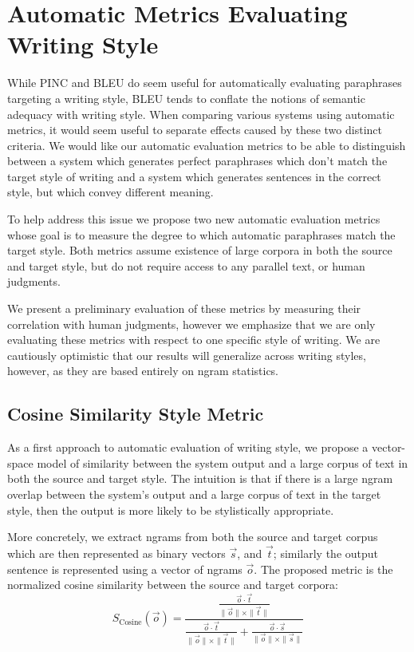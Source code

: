 \documentclass[10pt,a5paper,twoside]{article}
\begin{document}
\section{Automatic Metrics Evaluating Writing Style}
While PINC and BLEU do seem useful for automatically evaluating paraphrases targeting a  writing style, BLEU tends to conflate the notions of
semantic adequacy with writing style.  When comparing various systems using automatic metrics, it would seem useful
to separate effects caused by these two distinct criteria.  We would like our automatic evaluation metrics to be able to distinguish
between a system which generates perfect paraphrases which don't match the target style of writing and a system which
generates sentences in the correct style, but which convey different meaning.

To help address this issue we propose two new automatic evaluation metrics whose goal is to measure the degree to which
automatic paraphrases match the target style.  Both metrics assume existence of large corpora in both the source and
target style, but do not require access to any parallel text, or human judgments.

We present a preliminary evaluation of these metrics by measuring their correlation with human judgments, however
we emphasize that we are only evaluating these metrics with respect to one specific style of writing.  We
are cautiously optimistic that our results will generalize across writing styles, however, as they are based entirely
on ngram statistics.

\subsection{Cosine Similarity Style Metric}
As a first approach to automatic evaluation of writing style, we propose a vector-space model of similarity between the system
output and a large corpus of text in both the source and target style.  The intuition is that if there is a large ngram
overlap between the system's output and a large corpus of text in the target style, then the output is more likely to be
stylistically appropriate.

More concretely, we extract ngrams from both the source and target corpus which are then represented as binary
vectors $\vec{s}$, and $\vec{t}$; similarly the output sentence is represented using a vector of
ngrams $\vec{o}$.  
The proposed metric is the normalized cosine similarity between the source and target corpora:
\[
S_{\text{Cosine}}(\vec{o}) = \frac{\frac{\vec{o} \cdot \vec{t}}{\|\vec{o}\| \times \|\vec{t}\|}}{\frac{\vec{o} \cdot \vec{t}}{\|\vec{o}\| \times \|\vec{t}\|} + \frac{\vec{o} \cdot \vec{s}}{\|\vec{o}\| \times \|\vec{s}\|}}
\]
 
\end{document}
